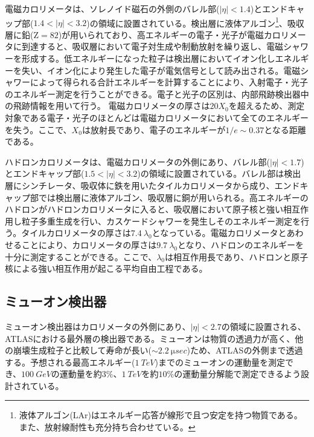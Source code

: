 電磁カロリメータは、ソレノイド磁石の外側のバレル部($|\eta|<1.4$)とエンドキャップ部($1.4<|\eta|<3.2$)の領域に設置されている。検出層に液体アルゴン\footnote{液体アルゴン(LAr)はエネルギー応答が線形で且つ安定を持つ物質である。また、放射線耐性も充分持ち合わせている。}、吸収層に鉛($\mathrm{Z}=82$)が用いられており、高エネルギーの電子・光子が電磁カロリメータに到達すると、吸収層において電子対生成や制動放射を繰り返し、電磁シャワーを形成する。低エネルギーになった粒子は検出層においてイオン化しエネルギーを失い、イオン化により発生した電子が電気信号として読み出される。電磁シャワーによって得られる合計エネルギーを計算することにより、入射電子・光子のエネルギー測定を行うことができる。電子と光子の区別は、内部飛跡検出器中の飛跡情報を用いて行う。
電磁カロリメータの厚さは$20X_0$を超えるため、測定対象である電子・光子のほとんどは電磁カロリメータにおいて全てのエネルギーを失う。ここで、$X_0$は放射長であり、電子のエネルギーが$1/e\sim0.37$となる距離である。

ハドロンカロリメータは、電磁カロリメータの外側にあり、バレル部($|\eta|<1.7$)とエンドキャップ部($1.5<|\eta|<3.2$)の領域に設置されている。バレル部は検出層にシンチレータ、吸収体に鉄を用いたタイルカロリメータから成り、エンドキャップ部では検出層に液体アルゴン、吸収層に銅が用いられる。高エネルギーのハドロンがハドロンカロリメータに入ると、吸収層において原子核と強い相互作用し粒子多重生成を行い、カスケードシャワーを発生しそのエネルギー測定を行う。タイルカロリメータの厚さは$7.4\ \lambda_0$となっている。電磁カロリメータとあわせることにより、カロリメータの厚さは$9.7\ \si{\lambda_0}$となり、ハドロンのエネルギーを十分に測定することができる。ここで、$\lambda_0$は相互作用長であり、ハドロンと原子核による強い相互作用が起こる平均自由工程である。


\subsection{ミューオン検出器}
\label{sec:mumu}
ミューオン検出器はカロリメータの外側にあり、$|\eta|<2.7$の領域に設置される、ATLASにおける最外層の検出器である。ミューオンは物質の透過力が高く、他の崩壊生成粒子と比較して寿命が長い($\sim 2.2\ \si{\micro sec}$)ため、ATLASの外側まで透過する。予想される最高エネルギー($1\ \si{TeV}$)までのミューオンの運動量を測定でき、$100\ \si{GeV}$の運動量を約$3\%$、$1\ \si{TeV}$を約$10\%$の運動量分解能で測定できるよう設計されている。

